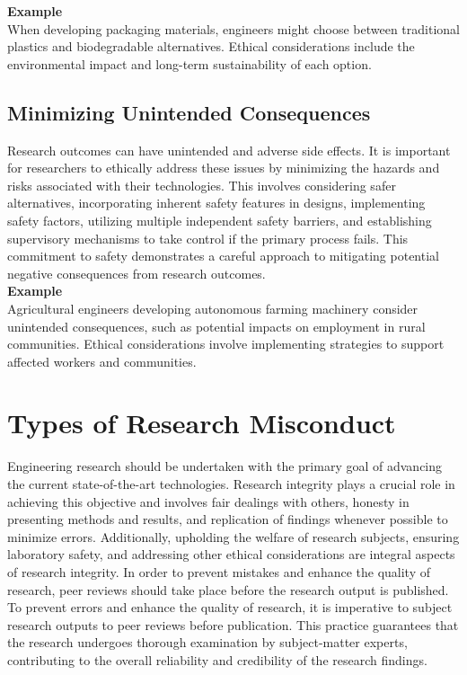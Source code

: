 \documentclass{article}
\begin{document}
	\noindent \textbf{Example} \\
	When developing packaging materials, engineers might choose between traditional plastics and biodegradable
	alternatives.
	Ethical considerations include the environmental impact and long-term sustainability of each option.

	\subsection{Minimizing Unintended Consequences}
	Research outcomes can have unintended and adverse side effects.
	It is important for researchers to ethically address these issues by minimizing the hazards and risks
	associated with their technologies.
	This involves considering safer alternatives, incorporating inherent safety features in designs,
	implementing safety factors, utilizing multiple independent safety barriers, and establishing supervisory
	mechanisms to take control if the primary process fails.
	This commitment to safety demonstrates a careful approach to mitigating potential negative consequences
	from research outcomes. \\

	\noindent \textbf{Example} \\
	Agricultural engineers developing autonomous farming machinery consider unintended consequences, such as
	potential impacts on employment in rural communities.
	Ethical considerations involve implementing strategies to support affected workers and communities.

	\section{Types of Research Misconduct}
	Engineering research should be undertaken with the primary goal of advancing the current state-of-the-art
	technologies.
	Research integrity plays a crucial role in achieving this objective and involves fair dealings with others,
	honesty in presenting methods and results, and replication of findings whenever possible to minimize errors.
	Additionally, upholding the welfare of research subjects, ensuring laboratory safety, and addressing other
	ethical considerations are integral aspects of research integrity.
	In order to prevent mistakes and enhance the quality of research, peer reviews should take place before the
	research output is published. \\
	
	\noindent To prevent errors and enhance the quality of research, it is imperative to subject research
	outputs to peer reviews before publication.
	This practice guarantees that the research undergoes thorough examination by subject-matter experts,
	contributing to the overall reliability and credibility of the research findings.
\end{document}
